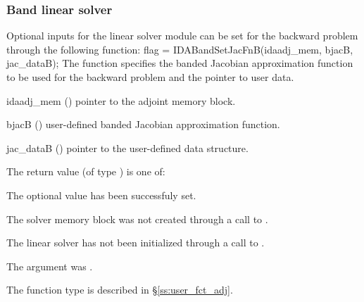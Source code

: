\subsubsection{Band linear solver}
Optional inputs for the {\idaband} linear solver module can be set for the backward
problem through the following function:
{
  flag = IDABandSetJacFnB(idaadj\_mem, bjacB, jac\_dataB);
}
{
  The function  specifies the banded Jacobian
  approximation function to be used for the backward problem and the
  pointer to user data.
}
{
  \begin{args}
  \item[idaadj\_mem] ()
    pointer to the adjoint memory block.
  \item[bjacB] ()
    user-defined banded Jacobian approximation function.
  \item[jac\_dataB] ()
    pointer to the user-defined data structure.
  \end{args}
}
{
  The return value  (of type ) is one of:
  \begin{args}
  \item[\Id{IDABAND\_SUCCESS}] 
    The optional value has been successfuly set.
  \item[\Id{IDABAND\_MEM\_NULL}]
    The {\idas} solver memory block was not created through a call to .
  \item[\Id{IDABAND\_LMEM\_NULL}]
    The {\idaband} linear solver has not been initialized through a call to .
  \item[\Id{IDABAND\_ADJMEM\_NULL}]
    The  argument was .
  \end{args}
}
{
  The function type  is described in \S\ref{ss:user_fct_adj}.
}

